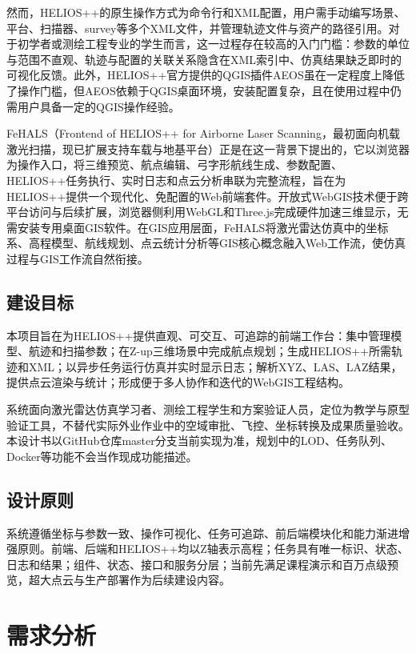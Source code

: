 \documentclass[a4paper,fleqn]{cas-sc}
\begin{document}
然而，HELIOS++的原生操作方式为命令行和XML配置，用户需手动编写场景、平台、扫描器、survey等多个XML文件，并管理轨迹文件与资产的路径引用。对于初学者或测绘工程专业的学生而言，这一过程存在较高的入门门槛：参数的单位与范围不直观、轨迹与配置的关联关系隐含在XML索引中、仿真结果缺乏即时的可视化反馈。此外，HELIOS++官方提供的QGIS插件AEOS\citep{aeos}虽在一定程度上降低了操作门槛，但AEOS依赖于QGIS桌面环境，安装配置复杂，且在使用过程中仍需用户具备一定的QGIS操作经验。

FeHALS（Frontend of HELIOS++ for Airborne Laser Scanning，最初面向机载激光扫描，现已扩展支持车载与地基平台）正是在这一背景下提出的，它以浏览器为操作入口，将三维预览、航点编辑、弓字形航线生成、参数配置、HELIOS++任务执行、实时日志和点云分析串联为完整流程，旨在为HELIOS++提供一个现代化、免配置的Web前端套件。开放式WebGIS技术便于跨平台访问与后续扩展\citep{opengis,viswebdrone,lidarWebgis}，浏览器侧利用WebGL和Three.js完成硬件加速三维显示，无需安装专用桌面GIS软件。在GIS应用层面，FeHALS将激光雷达仿真中的坐标系、高程模型、航线规划、点云统计分析等GIS核心概念融入Web工作流，使仿真过程与GIS工作流自然衔接\citep{pointCloudWeb}。

\subsection{建设目标}

本项目旨在为HELIOS++提供直观、可交互、可追踪的前端工作台：集中管理模型、航迹和扫描参数；在Z-up三维场景中完成航点规划；生成HELIOS++所需轨迹和XML；以异步任务运行仿真并实时显示日志；解析XYZ、LAS、LAZ结果，提供点云渲染与统计；形成便于多人协作和迭代的WebGIS工程结构。

系统面向激光雷达仿真学习者、测绘工程学生和方案验证人员，定位为教学与原型验证工具，不替代实际外业作业中的空域审批、飞控、坐标转换及成果质量验收。本设计书以GitHub仓库master分支当前实现为准，规划中的LOD、任务队列、Docker等功能不会当作现成功能描述。

\subsection{设计原则}

系统遵循坐标与参数一致、操作可视化、任务可追踪、前后端模块化和能力渐进增强原则。前端、后端和HELIOS++均以Z轴表示高程；任务具有唯一标识、状态、日志和结果；组件、状态、接口和服务分层；当前先满足课程演示和百万点级预览，超大点云与生产部署作为后续建设内容。

\section{需求分析}
\end{document}
